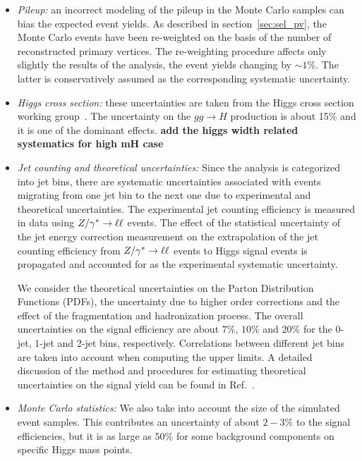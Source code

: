 \begin{itemize}
\item {\it Pileup:} an incorrect modeling of the pileup in the Monte Carlo samples 
can bias the expected event yields. As described in section~\ref{sec:sel_pv}, 
the Monte Carlo events have been re-weighted on the basis of the number of reconstructed
primary vertices. The re-weighting procedure affects only slightly the results of the analysis,
the event yields changing by $\sim1\%$. The latter is conservatively assumed as 
the corresponding systematic uncertainty. 

\item {\it Higgs cross section:} these uncertainties are taken from the Higgs cross
section working group~\cite{LHCHiggsCrossSectionWorkingGroup:2011ti}. The uncertainty 
on the $gg \to H$ production is about 15\% and it is one of the dominant effects.
{\bf \fixme add the higgs width related systematics for high mH case}

\item {\it Jet counting and theoretical uncertainties:} 
Since the analysis is categorized into jet bins, there are systematic uncertainties
associated with events migrating from one jet bin to the next one due to 
experimental and theoretical uncertainties. The experimental jet counting efficiency is 
measured in data using $Z/\gamma^*\to\ell\ell$ events. The effect of the statistical uncertainty 
of the jet energy correction measurement on the extrapolation
of the jet counting efficiency from $Z/\gamma^*\to\ell\ell$ events to Higgs signal
events is propagated and accounted for as the experimental 
systematic uncertainty.

We consider the theoretical uncertainties on the Parton Distribution Functions (PDFs), 
the uncertainty due to higher order corrections and the effect of the fragmentation and 
hadronization process. The overall uncertainties on the signal efficiency are 
about $7\%$, $10\%$ and $20\%$ for the 0-jet, 1-jet and 2-jet bins, respectively.
Correlations between different jet bins are taken into account when computing
the upper limits. A detailed discussion of the method and procedures for estimating
theoretical uncertainties on the signal yield can be found in Ref.~\cite{HWW2011AN}. 

\item {\it Monte Carlo statistics:} We also take into account the 
size of the simulated event samples. 
This contributes an uncertainty of about $2-3\%$ to the signal
efficiencies, but it is as large as $50\%$ for some background components on specific
Higgs mass points.
\end{itemize}


